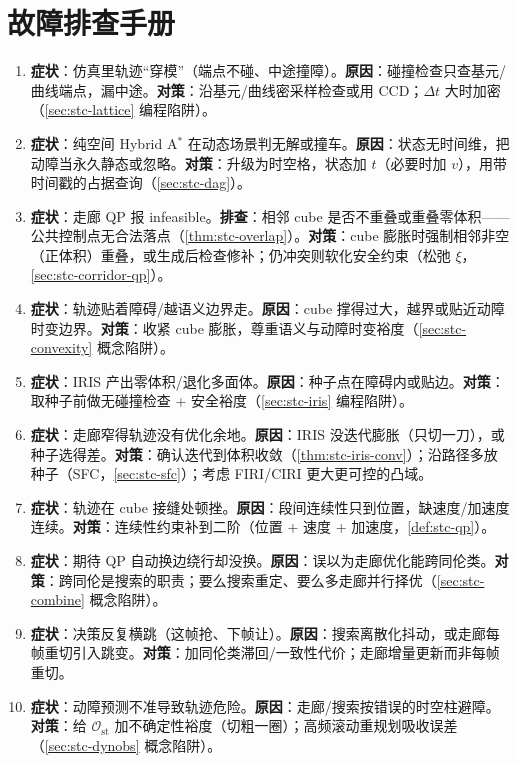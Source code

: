 \section*{故障排查手册}
\begin{enumerate}
  \item \textbf{症状}：仿真里轨迹“穿模”（端点不碰、中途撞障）。\textbf{原因}：碰撞检查只查基元/曲线端点，漏中途。\textbf{对策}：沿基元/曲线密采样检查或用 CCD；$\Delta t$ 大时加密（\cref{sec:stc-lattice} 编程陷阱）。
  \item \textbf{症状}：纯空间 Hybrid A$^*$ 在动态场景判无解或撞车。\textbf{原因}：状态无时间维，把动障当永久静态或忽略。\textbf{对策}：升级为时空格，状态加 $t$（必要时加 $v$），用带时间戳的占据查询（\cref{sec:stc-dag}）。
  \item \textbf{症状}：走廊 QP 报 infeasible。\textbf{排查}：相邻 cube 是否不重叠或重叠零体积——公共控制点无合法落点（\cref{thm:stc-overlap}）。\textbf{对策}：cube 膨胀时强制相邻非空（正体积）重叠，或生成后检查修补；仍冲突则软化安全约束（松弛 $\xi$，\cref{sec:stc-corridor-qp}）。
  \item \textbf{症状}：轨迹贴着障碍/越语义边界走。\textbf{原因}：cube 撑得过大，越界或贴近动障时变边界。\textbf{对策}：收紧 cube 膨胀，尊重语义与动障时变裕度（\cref{sec:stc-convexity} 概念陷阱）。
  \item \textbf{症状}：IRIS 产出零体积/退化多面体。\textbf{原因}：种子点在障碍内或贴边。\textbf{对策}：取种子前做无碰撞检查 + 安全裕度（\cref{sec:stc-iris} 编程陷阱）。
  \item \textbf{症状}：走廊窄得轨迹没有优化余地。\textbf{原因}：IRIS 没迭代膨胀（只切一刀），或种子选得差。\textbf{对策}：确认迭代到体积收敛（\cref{thm:stc-iris-conv}）；沿路径多放种子（SFC，\cref{sec:stc-sfc}）；考虑 FIRI/CIRI 更大更可控的凸域。
  \item \textbf{症状}：轨迹在 cube 接缝处顿挫。\textbf{原因}：段间连续性只到位置，缺速度/加速度连续。\textbf{对策}：连续性约束补到二阶（位置 + 速度 + 加速度，\cref{def:stc-qp}）。
  \item \textbf{症状}：期待 QP 自动换边绕行却没换。\textbf{原因}：误以为走廊优化能跨同伦类。\textbf{对策}：跨同伦是搜索的职责；要么搜索重定、要么多走廊并行择优（\cref{sec:stc-combine} 概念陷阱）。
  \item \textbf{症状}：决策反复横跳（这帧抢、下帧让）。\textbf{原因}：搜索离散化抖动，或走廊每帧重切引入跳变。\textbf{对策}：加同伦类滞回/一致性代价；走廊增量更新而非每帧重切。
  \item \textbf{症状}：动障预测不准导致轨迹危险。\textbf{原因}：走廊/搜索按错误的时空柱避障。\textbf{对策}：给 $\mathcal{O}_{\mathrm{st}}$ 加不确定性裕度（切粗一圈）；高频滚动重规划吸收误差（\cref{sec:stc-dynobs} 概念陷阱）。
\end{enumerate}
